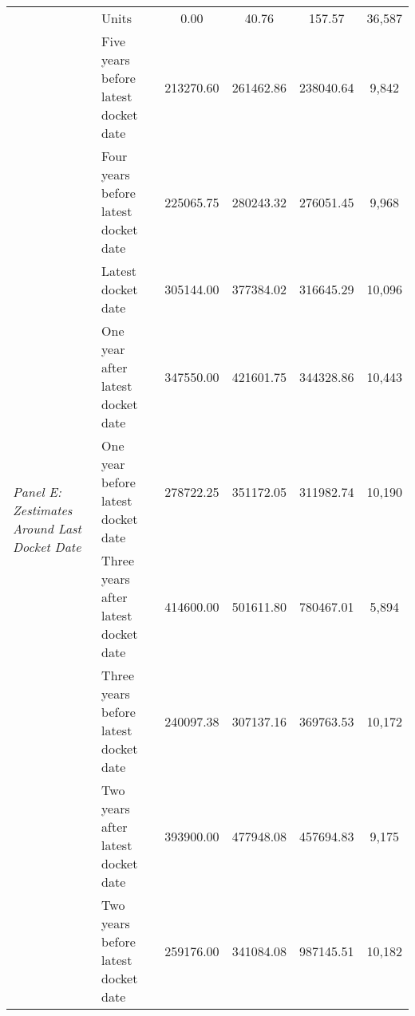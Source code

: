 \begin{tabular}{llcccc}
 & Units & 0.00 & 40.76 & 157.57 & 36,587 \\
\cline{1-6}
\multirow[c]{9}{4cm}{\textit{Panel E: Zestimates Around Last Docket Date}} & Five years before latest docket date & 213270.60 & 261462.86 & 238040.64 & 9,842 \\
 & Four years before latest docket date & 225065.75 & 280243.32 & 276051.45 & 9,968 \\
 & Latest docket date & 305144.00 & 377384.02 & 316645.29 & 10,096 \\
 & One year after latest docket date & 347550.00 & 421601.75 & 344328.86 & 10,443 \\
 & One year before latest docket date & 278722.25 & 351172.05 & 311982.74 & 10,190 \\
 & Three years after latest docket date & 414600.00 & 501611.80 & 780467.01 & 5,894 \\
 & Three years before latest docket date & 240097.38 & 307137.16 & 369763.53 & 10,172 \\
 & Two years after latest docket date & 393900.00 & 477948.08 & 457694.83 & 9,175 \\
 & Two years before latest docket date & 259176.00 & 341084.08 & 987145.51 & 10,182 \\
\cline{1-6}
\bottomrule
\end{tabular}
